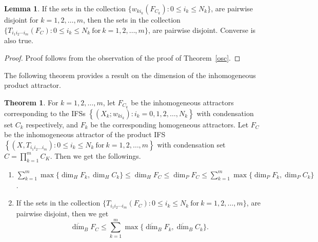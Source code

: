 \documentclass[10pt]{amsart}
\theoremstyle{definition}
\newtheorem{thm}{Theorem}[section]
\newtheorem{lm}{Lemma}[section]
\begin{document}
	\begin{lm}
		If the sets in the collection $\{w_{ki_k}(F_{C_k}):0\leq i_k\leq N_k\}$, are pairwise disjoint for $k=1,2,\ldots,m$, then the sets in the collection  $\{T_{i_1i_2\cdots i_m}(F_C):0\leq i_k\leq N_k~\mbox{for}~k=1,2,\ldots,m\}$, are pairwise disjoint. Converse is also true.	
		\label{tdict}
	\end{lm}
	\begin{proof}
		Proof  follows from the  observation of the proof of Theorem~\ref{osc}.
	\end{proof}
	The following  theorem provides a result on the dimension of the inhomogeneous product attractor.
	\begin{thm}
		For $k=1,2,\ldots,m$, let $F_{C_k}$ be the inhomogeneous attractors corresponding to the IFSs $\left\{(X_k;w_{ki_k}):i_k=0,1,2,\ldots,N_k\right\}$ with condensation set $C_k$ respectively, and $F_k$ be the corresponding homogeneous attractors. Let $F_C$ be the inhomogeneous attractor of the product IFS\\ $\left\{(X,T_{i_1i_2\ldots i_m}):0\leq i_k\leq N_k~\mbox{for}~k=1,2,\ldots,m\right\}$ with condensation set $C=\prod_{k=1}^mC_K$. Then we get the followings.
		\begin{enumerate}
			\item $\sum_{k=1}^{m}\max\{\dim_HF_k,\dim_HC_k\}\leq\dim_HF_C\leq\dim_PF_C\leq \sum_{k=1}^{m}\max\{\dim_PF_k,\dim_PC_k\}$.
			\item If the sets in the collection  $\{T_{i_1i_2\cdots i_m}(F_C):0\leq i_k\leq N_k~\mbox{for}~k=1,2,\ldots,m\}$, are pairwise disjoint, then we get  $$\overline{\dim}_BF_C\leq\sum_{k=1}^{m}\max\{\overline{\dim}_BF_k,\overline{\dim}_BC_k\}.$$
		\end{enumerate}
		\label{dotinha}
	\end{thm}
	
\end{document}
